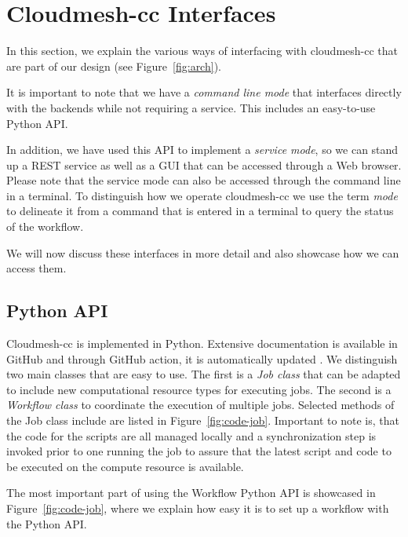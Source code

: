 
\section{Cloudmesh-cc Interfaces}

In this section, we explain the various ways of interfacing with
cloudmesh-cc that are part of our design (see Figure~\ref{fig:arch}).

It is important to note that we have a {\em command line mode} that interfaces directly with the backends while not requiring a service. This includes an easy-to-use Python API.

In addition, we have used this API to implement a {\em service mode}, so we can stand up a REST service as well as a GUI that can be accessed through a Web browser.
Please note that the service mode can also be accessed through the command line in a terminal. To distinguish how we operate cloudmesh-cc we use the term {\em mode} to delineate it from a command that is entered in a terminal to query the status of the workflow.

We will now discuss these interfaces in more detail and also showcase
how we can access them.


\subsection{Python API}

Cloudmesh-cc is implemented in Python. Extensive documentation is
available in GitHub and through GitHub action, it is automatically
updated \cite{github-cloudmesh-cc}.  We distinguish two main classes
that are easy to use. The first is a {\em Job class} that can be adapted
to include new computational resource types for executing jobs. The
second is a {\em Workflow class} to coordinate the execution of
multiple jobs. Selected methods of the Job class include are listed in
Figure~\ref{fig:code-job}. Important to note is, that the code for the
scripts are all managed locally and a synchronization step is invoked
prior to one running the job to assure that the latest script and
code to be executed on the compute resource is available.

The most important part of using the Workflow Python API is showcased
in Figure~\ref{fig:code-job}, where we explain how easy it is to set up a workflow
with the Python API.

